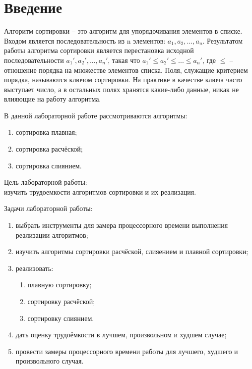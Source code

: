 \section*{\large Введение}

\par Алгоритм сортировки – это алгоритм для упорядочивания элементов в списке. Входом является последовательность из n элементов: \begin{math}a_1, a_2, ..., a_n\end{math}. Результатом работы алгоритма сортировки является перестановка исходной последовательности \begin{math}a_1', a_2', ..., a_n'\end{math}, такая что
\begin{math}a_1' \leq a_2'\leq ... \leq a_n'\end{math}, где \begin{math}\leq\end{math} – отношение порядка на множестве элементов списка. Поля, служащие критерием порядка, называются ключом сортировки. На практике в качестве ключа часто выступает число, а в остальных полях хранятся какие-либо данные, никак не влияющие на работу алгоритма.
	
	В данной лабораторной работе рассмотриваются алгоритмы:

	\begin{enumerate}
		\item сортировка плавная;
		\item сортировка расчёской;
		\item сортировка слиянием.
	\end{enumerate}

	Цель лабораторной работы:\\
	изучить трудоемкости алгоритмов сортировки и их реализация.

	Задачи лабораторной работы:
	\begin{enumerate}
		\item выбрать инструменты для замера процессорного времени выполнения реализации алгоритмов;
		\item изучить алгоритмы сортировки расчёской, слияением и плавной сортировки;
		\item реализовать:
		\begin{enumerate}
			\item плавную сортировку;
			\item сортировку расчёской;
			\item сортировку слиянием.
		\end{enumerate}
		\item дать оценку трудоёмкости в лучшем, произвольном и худшем случае;
		\item провести замеры процессорного времени работы для лучшего, худшего и произвольного случая.
	\end{enumerate}
\newpage